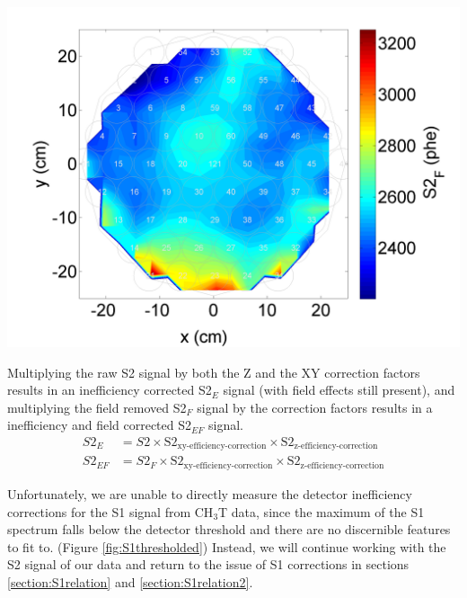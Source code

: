 \documentclass[a4paper,12pt]{article}
\begin{document}
{\begin{center}
\includegraphics[scale=0.5]{Run04Corrections/CH3T_S2_XYDep.png}
 \label{fig:TritXYDep}
\end{center}


Multiplying the raw S2 signal by both the Z and the XY correction factors results in an inefficiency corrected S2$_E$ signal (with field effects still present), and multiplying the field removed S2$_F$ signal by the correction factors results in a inefficiency and field corrected S2$_{EF}$ signal.
\begin{align}
S2_E &=S2 \times \mbox{S}2_{\mbox{xy-efficiency-correction}} \times \mbox{S}2_{\mbox{z-efficiency-correction}} \label{E_eq}\\
S2_{EF} &=S2_F \times \mbox{S}2_{\mbox{xy-efficiency-correction}} \times \mbox{S}2_{\mbox{z-efficiency-correction}} 
\label{EF_eq}
\end{align}

Unfortunately, we are unable to directly measure the detector inefficiency corrections for the S1 signal from CH$_3$T data, since the maximum of the S1 spectrum falls below the detector threshold and there are no discernible features to fit to. (Figure \ref{fig:S1thresholded}) Instead, we will continue working with the S2 signal of our data and return to the issue of S1 corrections in sections \ref{section:S1relation} and \ref{section:S1relation2}.


}
\end{document}
